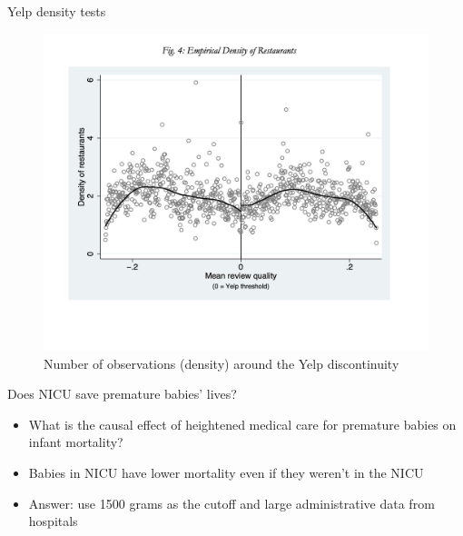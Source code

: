 \documentclass{beamer}
\begin{document}
\begin{frame}{Yelp density tests}
\begin{figure}
    \includegraphics[scale=0.35]{./lecture_includes/yelp_density}
    \caption{Number of observations (density) around the Yelp discontinuity}
\end{figure}


\end{frame}



\begin{frame}{Does NICU save premature babies' lives?}

\begin{itemize}
\item What is the causal effect of heightened medical care for premature babies on infant mortality?  
\item Babies in NICU have lower mortality even if they weren't in the NICU
\item Answer: use 1500 grams as the cutoff and large administrative data from hospitals
\end{itemize}

\end{frame}
\end{document}
